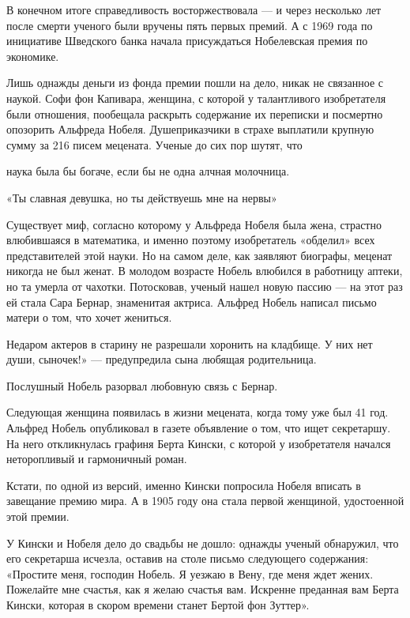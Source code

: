 В конечном итоге справедливость восторжествовала --- и через несколько лет после смерти ученого были вручены пять первых премий. А с 1969 года по инициативе Шведского банка начала присуждаться Нобелевская премия по экономике.

Лишь однажды деньги из фонда премии пошли на дело, никак не связанное с наукой. Софи фон Капивара, женщина, с которой у талантливого изобретателя были отношения, пообещала раскрыть содержание их переписки и посмертно опозорить Альфреда Нобеля. Душеприказчики в страхе выплатили крупную сумму за 216 писем мецената. Ученые до сих пор шутят, что

\begin{fancyquotes}
    наука была бы богаче, если бы не одна алчная молочница.
\end{fancyquotes}

«Ты славная девушка, но ты действуешь мне на нервы»

Существует миф, согласно которому у Альфреда Нобеля была жена, страстно влюбившаяся в математика, и именно поэтому изобретатель «обделил» всех представителей этой науки. Но на самом деле, как заявляют биографы, меценат никогда не был женат. В молодом возрасте Нобель влюбился в работницу аптеки, но та умерла от чахотки. Потосковав, ученый нашел новую пассию --- на этот раз ей стала Сара Бернар, знаменитая актриса. Альфред Нобель написал письмо матери о том, что хочет жениться.

\begin{fancyquotes}
    Недаром актеров в старину не разрешали хоронить на кладбище. У них нет души, сыночек!» --- предупредила сына любящая родительница.
\end{fancyquotes}



Послушный Нобель разорвал любовную связь с Бернар.

Следующая женщина появилась в жизни мецената, когда тому уже был 41 год. Альфред Нобель опубликовал в газете объявление о том, что ищет секретаршу. На него откликнулась графиня Берта Кински, с которой у изобретателя начался неторопливый и гармоничный роман.

\begin{fancyquotes}
    Кстати, по одной из версий, именно Кински попросила Нобеля вписать в завещание премию мира. А в 1905 году она стала первой женщиной, удостоенной этой премии.
\end{fancyquotes}

У Кински и Нобеля дело до свадьбы не дошло: однажды ученый обнаружил, что его секретарша исчезла, оставив на столе письмо следующего содержания: «Простите меня, господин Нобель. Я уезжаю в Вену, где меня ждет жених. Пожелайте мне счастья, как я желаю счастья вам. Искренне преданная вам Берта Кински, которая в скором времени станет Бертой фон Зуттер».

